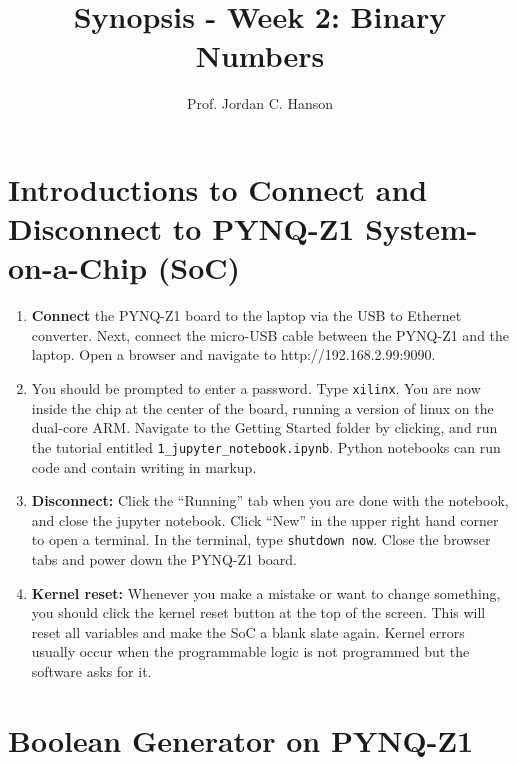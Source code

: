 \documentclass{article}
\begin{document}
\title{Synopsis - Week 2: Binary Numbers}
\author{Prof. Jordan C. Hanson}

\maketitle

\section{Introductions to Connect and Disconnect to PYNQ-Z1 System-on-a-Chip (SoC)}

\begin{enumerate}
\item \textbf{Connect} the PYNQ-Z1 board to the laptop via the USB to Ethernet converter.  Next, connect the micro-USB cable between the PYNQ-Z1 and the laptop.  Open a browser and navigate to http://192.168.2.99:9090.
\item You should be prompted to enter a password.  Type \verb+xilinx+.  You are now inside the chip at the center of the board, running a version of linux on the dual-core ARM.  Navigate to the Getting Started folder by clicking, and run the tutorial entitled \verb+1_jupyter_notebook.ipynb+.  Python notebooks can run code and contain writing in markup.
\item \textbf{Disconnect:} Click the ``Running'' tab when you are done with the notebook, and close the jupyter notebook.  Click ``New'' in the upper right hand corner to open a terminal.  In the terminal, type \verb+shutdown now+.  Close the browser tabs and power down the PYNQ-Z1 board.
\item \textbf{Kernel reset:}  Whenever you make a mistake or want to change something, you should click the kernel reset button at the top of the screen.  This will reset all variables and make the SoC a blank slate again.  Kernel errors usually occur when the programmable logic is not programmed but the software asks for it.
\end{enumerate}

\section{Boolean Generator on PYNQ-Z1}
\end{document}
